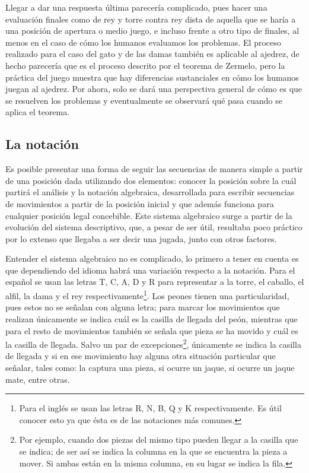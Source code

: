 \documentclass[twoside,openright,12pt,a4paper,spanish]{book}
\begin{document}
Llegar a dar una respuesta última parecería complicado, pues hacer una evaluación finales como de rey y torre contra rey dista de aquella que se haría a una posición de apertura o medio juego, e incluso frente a otro tipo de finales, al menos en el caso de cómo los humanos evaluamos los problemas. El proceso realizado para el caso del gato y de las damas también es aplicable al ajedrez, de hecho parecería que es el proceso descrito por el teorema de Zermelo, pero la práctica del juego muestra que hay diferencias sustanciales en cómo los humanos juegan al ajedrez. Por ahora, solo se dará una perspectiva general de cómo es que se resuelven los problemas y eventualmente se observará qué pasa cuando se aplica el teorema.

\subsection{La notación}
\noindent Es posible presentar una forma de seguir las secuencias de manera simple a partir de una posición dada utilizando dos elementos: conocer la posición sobre la cuál partirá el análisis y la notación algebraica, desarrollada para escribir secuencias de movimientos a partir de la posición inicial y que además funciona para cualquier posición legal concebible. Este sistema algebraico surge a partir de la evolución del sistema descriptivo, que, a pesar de ser útil, resultaba poco práctico por lo extenso que llegaba a ser decir una jugada, junto con otros factores.


Entender el sistema algebraico no es complicado, lo primero a tener en cuenta es que dependiendo del idioma habrá una variación respecto a la notación. Para el español se usan las letras T, C, A, D y R para representar a la torre, el caballo, el alfil, la dama y el rey respectivamente\footnote{Para el inglés se usan las letras R, N, B, Q y K respectivamente. Es útil conocer esto ya que ésta es de las notaciones más comunes.}. Los peones tienen una particularidad, pues estos no se señalan con alguna letra; para marcar los movimientos que realizan únicamente se indica cuál es la casilla de llegada del peón, mientras que para el resto de movimientos también se señala que pieza se ha movido y cuál es la casilla de llegada. Salvo un par de excepciones\footnote{Por ejemplo, cuando dos piezas del mismo tipo pueden llegar a la casilla que se indica; de ser así se indica la columna en la que se encuentra la pieza a mover. Si ambas están en la misma columna, en su lugar se indica la fila.}, únicamente se indica la casilla de llegada y si en ese movimiento hay alguna otra situación particular que señalar, tales como: la captura una pieza, si ocurre un jaque, si ocurre un jaque mate, entre otras.
\end{document}
